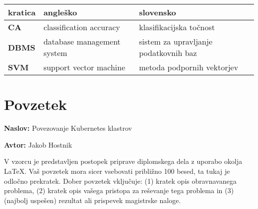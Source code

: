 \documentclass[a4paper, 12pt]{book}
\newcommand{\ttitle}{Povezovanje Kubernetes klastrov}
\newcommand{\tauthor}{Jakob Hostnik}
\newcommand{\clearemptydoublepage}{\newpage{\pagestyle{empty}\cleardoublepage}}
\begin{document}
\begin{comment}
\begin{tabular}{l|l|l}
  {\bf kratica} & {\bf angleško} & {\bf slovensko} \\ \hline
  {\bf CA} & classification accuracy & klasifikacijska točnost \\
  {\bf DBMS} & database management system & sistem za upravljanje podatkovnih baz \\
  {\bf SVM} & support vector machine & metoda podpornih vektorjev \\
  \dots & \dots & \dots \\
\end{tabular}
\end{comment}

\noindent\begin{tabular}{p{}|p{}|p{}}    %
  {\bf kratica} & {\bf angleško}                             & {\bf slovensko} \\ \hline
  {\bf CA}      & classification accuracy               & klasifikacijska točnost \\
  {\bf DBMS} & database management system & sistem za upravljanje podatkovnih baz \\
  {\bf SVM}   & support vector machine              & metoda podpornih vektorjev \\
\end{tabular}


\clearemptydoublepage

\chapter*{Povzetek}

\noindent\textbf{Naslov:} \ttitle
\bigskip

\noindent\textbf{Avtor:} \tauthor
\bigskip

\noindent V vzorcu je predstavljen postopek priprave diplomskega dela z uporabo okolja \LaTeX. Vaš povzetek mora sicer vsebovati približno 100 besed, ta tukaj je odločno prekratek.
Dober povzetek vključuje: (1) kratek opis obravnavanega problema, (2) kratek opis vašega pristopa za reševanje tega problema in (3) (najbolj uspešen) rezultat ali prispevek magistrske naloge.
\end{document}
